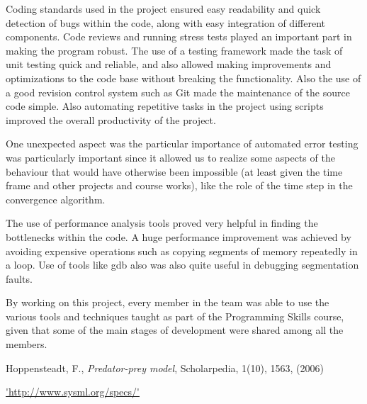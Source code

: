 \documentclass[12pt,a4paper]{article}
\begin{document}
Coding standards used in the project ensured easy readability and quick detection of bugs within the code, along with easy integration of different components. Code reviews and running stress tests played an important part in making the program robust. The use of a testing framework made the task of unit testing quick and reliable, and also allowed making improvements and optimizations to the code base without breaking the functionality. Also the use of a good revision control system such as Git made the maintenance of the source code simple. Also automating repetitive tasks in the project using scripts improved the overall productivity of the project.
 
One unexpected aspect was the particular importance of automated error testing was particularly important since it  allowed us to realize some aspects of the behaviour that would have otherwise been impossible (at least given the time frame and other projects and course works), like the role of the time step in the convergence algorithm.

The use of performance analysis tools proved very helpful in finding the bottlenecks within the code. A huge performance improvement was achieved by avoiding expensive operations such as copying segments of memory repeatedly in a loop. Use of tools like gdb also was also quite useful in debugging segmentation faults.

By working on this project, every member in the team was able to use the various tools and techniques taught as part of the Programming Skills course, given that some of the main stages of development were shared among all the members.
 




\begin{thebibliography}{100}


 Hoppensteadt, F., \emph{Predator-prey model}, Scholarpedia, 1(10), 1563, (2006)

 \url{'http://www.sysml.org/specs/'}


\end{thebibliography}
\end{document}
